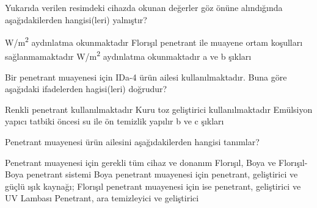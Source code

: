 \begin{question}[subtitle=]
      	\begin{figure}[!htb]
		\centering
	\end{figure}

  Yukarıda verilen resimdeki cihazda okunan değerler göz önüne alındığında aşağıdakilerden
  hangisi(leri) yalnıştır?
	\begin{tasks}
           \si[per-mode=symbol] {\watt\per\m^{2}} aydınlatma okunmaktadır
          \task Florışıl penetrant ile muayene ortam koşulları sağlanmamaktadır
           \si[per-mode=symbol] {\watt\per\m^{2}} aydınlatma okunmaktadır
          \task a ve b şıkları \correct
	\end{tasks}
\end{question}
\begin{solution}
	\correct
\end{solution}

\begin{question}[subtitle=]
  Bir penetrant muayenesi için IDa-4 ürün ailesi kullanılmaktadır. Buna göre
  aşağıdaki ifadelerden hagisi(leri) doğrudur?
	\begin{tasks}
          \task Renkli penetrant kullanılmaktadır
          \task Kuru toz geliştirici kullanılmaktadır
          \task Emülsiyon yapıcı tatbiki öncesi su ile ön temizlik yapılır
          \task b ve c şıkları \correct
	\end{tasks}
\end{question}
\begin{solution}
	\correct
\end{solution}

\begin{question}[subtitle=]
	Penetrant muayenesi ürün ailesini aşağıdakilerden hangisi tanımlar?
	
	\begin{tasks}
		\task Penetrant muayenesi için gerekli tüm cihaz ve donanım
		\task Florışıl, Boya ve Florışıl-Boya penetrant sistemi
		\task Boya penetrant muayenesi için penetrant, geliştirici ve güçlü ışık kaynağı;
                Florışıl penetrant muayenesi için ise penetrant, geliştirici ve UV Lambası
		\task Penetrant, ara temizleyici ve geliştirici \correct
	\end{tasks}
\end{question}
\begin{solution}
	\correct
\end{solution}

